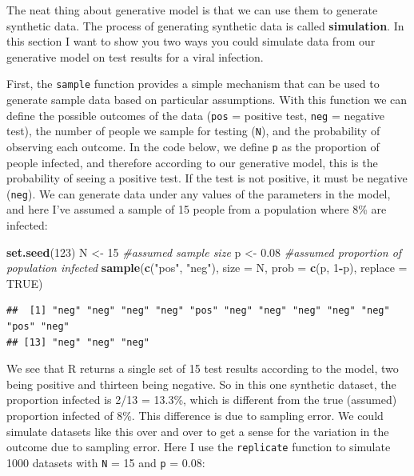 \documentclass[
]{book}
\newenvironment{Shaded}{\begin{snugshade}}{\end{snugshade}}
\newcommand{\AttributeTok}[1]{\textcolor[rgb]{0.13,0.29,0.53}{#1}}
\newcommand{\CommentTok}[1]{\textcolor[rgb]{0.56,0.35,0.01}{\textit{#1}}}
\newcommand{\ConstantTok}[1]{\textcolor[rgb]{0.56,0.35,0.01}{#1}}
\newcommand{\DecValTok}[1]{\textcolor[rgb]{0.00,0.00,0.81}{#1}}
\newcommand{\FloatTok}[1]{\textcolor[rgb]{0.00,0.00,0.81}{#1}}
\newcommand{\FunctionTok}[1]{\textcolor[rgb]{0.13,0.29,0.53}{\textbf{#1}}}
\newcommand{\NormalTok}[1]{#1}
\newcommand{\OtherTok}[1]{\textcolor[rgb]{0.56,0.35,0.01}{#1}}
\newcommand{\SpecialCharTok}[1]{\textcolor[rgb]{0.81,0.36,0.00}{\textbf{#1}}}
\newcommand{\StringTok}[1]{\textcolor[rgb]{0.31,0.60,0.02}{#1}}
\begin{document}
The neat thing about generative model is that we can use them to
generate synthetic data. The process of generating synthetic data is
called \textbf{simulation}. In this section I want to show you two ways you
could simulate data from our generative model on test results for a
viral infection.

First, the \texttt{sample} function provides a simple mechanism that can be
used to generate sample data based on particular assumptions. With this
function we can define the possible outcomes of the data (\texttt{pos} =
positive test, \texttt{neg} = negative test), the number of people we sample
for testing (\texttt{N}), and the probability of observing each outcome. In the
code below, we define \texttt{p} as the proportion of people infected, and
therefore according to our generative model, this is the probability of
seeing a positive test. If the test is not positive, it must be negative
(\texttt{neg}). We can generate data under any values of the parameters in the
model, and here I've assumed a sample of 15 people from a population
where 8\% are infected:

\begin{Shaded}
\begin{Highlighting}[]
\FunctionTok{set.seed}\NormalTok{(}\DecValTok{123}\NormalTok{)}
\NormalTok{N }\OtherTok{\textless{}{-}} \DecValTok{15}    \CommentTok{\#assumed sample size}
\NormalTok{p }\OtherTok{\textless{}{-}} \FloatTok{0.08}  \CommentTok{\#assumed proportion of population infected}
\FunctionTok{sample}\NormalTok{(}\FunctionTok{c}\NormalTok{(}\StringTok{"pos"}\NormalTok{, }\StringTok{"neg"}\NormalTok{), }\AttributeTok{size =}\NormalTok{ N, }\AttributeTok{prob =} \FunctionTok{c}\NormalTok{(p, }\DecValTok{1}\SpecialCharTok{{-}}\NormalTok{p), }\AttributeTok{replace =} \ConstantTok{TRUE}\NormalTok{)}
\end{Highlighting}
\end{Shaded}

\begin{verbatim}
##  [1] "neg" "neg" "neg" "neg" "pos" "neg" "neg" "neg" "neg" "neg" "pos" "neg"
## [13] "neg" "neg" "neg"
\end{verbatim}

We see that R returns a single set of 15 test results according to the
model, two being positive and thirteen being negative. So in this one
synthetic dataset, the proportion infected is 2/13 = 13.3\%, which is
different from the true (assumed) proportion infected of 8\%. This
difference is due to sampling error. We could simulate datasets like
this over and over to get a sense for the variation in the outcome due
to sampling error. Here I use the \texttt{replicate} function to simulate 1000
datasets with \texttt{N} = 15 and \texttt{p} = 0.08:
\end{document}
